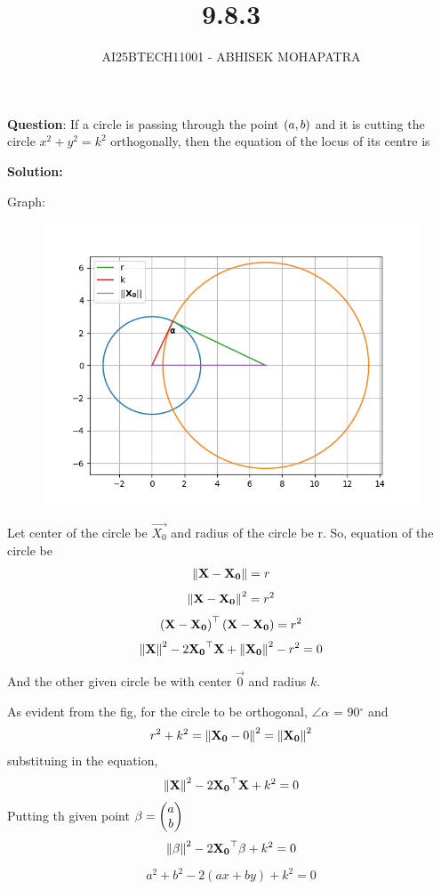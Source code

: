 \documentclass{beamer}
\title{9.8.3}
\author{AI25BTECH11001 - ABHISEK MOHAPATRA}
\numberwithin{equation}{section}
\begin{document}
{\let\newpage\relax\maketitle}
\renewcommand{\thefigure}{\theenumi}
\renewcommand{\thetable}{\theenumi}



	 	\textbf{Question}:
If a circle is passing through the point $\left(a, b\right)$ and it is cutting the circle $x^2 + y^2 = k^2$ orthogonally, then the equation of the locus of its centre is
		
		\textbf{Solution:}

	Graph:
\begin{figure}[h!]
	\centering
	\includegraphics[width=0.55\linewidth]{img.png}
\end{figure}

Let center of the circle be $\vec{X_0}$ and radius of the circle be r.
So, equation of the circle be
\begin{align}
		\left\lVert\mathbf{X}-\mathbf{X_0}\right\rVert = r
\end{align}
\begin{align}
		\left\lVert\mathbf{X}-\mathbf{X_0}\right\rVert^2 = r^2
\end{align}
\begin{align}
		\left(\mathbf{X}-\mathbf{X_0}\right)^\top\left(\mathbf{X}-\mathbf{X_0}\right) = r^2
\end{align}
\begin{align}
		\left\lVert\mathbf{X}\right\rVert^2-2\mathbf{X_0}^\top \mathbf{X}+\left\lVert\mathbf{X_0}\right\rVert^2-r^2 = 0
\end{align}

And the other given circle be with center $\vec{0}$ and radius $k$.

As evident from the fig, for the circle to be orthogonal, $\angle\alpha$ = 90$^\circ$ and
\begin{align}
		r^2 + k^2 = \left\lVert\mathbf{X_0} - 0\right\rVert^2= \left\lVert\mathbf{X_0}\right\rVert^2
\end{align}
substituing in the equation,
\begin{align}
		\left\lVert\mathbf{X}\right\rVert^2-2\mathbf{X_0}^\top \mathbf{X}+k^2 = 0
\end{align}
Putting th given point $\mathbf{\beta} = \begin{pmatrix}a\\b\end{pmatrix}$
\begin{align}
		\left\lVert\mathbf{\beta}\right\rVert^2-2\mathbf{X_0}^\top \mathbf{\beta}+k^2 = 0
\end{align}
\begin{align}
		a^2+b^2-2(ax+by)+k^2 = 0
\end{align}
\end{document}
